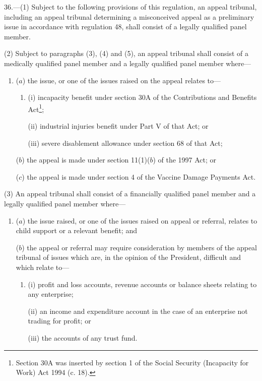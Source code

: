 \documentclass[12pt,a4paper]{article}
\begin{document}
36.—(1) Subject to the following provisions of this regulation, an appeal tribunal, including an appeal tribunal determining a misconceived appeal as a preliminary issue in accordance with regulation 48, shall consist of a legally qualified panel member.

(2) Subject to paragraphs (3), (4) and (5), an appeal tribunal shall consist of a medically qualified panel member and a legally qualified panel member where—
\begin{enumerate}\item[]
($a$) the issue, or one of the issues raised on the appeal relates to—
\begin{enumerate}\item[]
(i) incapacity benefit under section 30A of the Contributions and Benefits Act\footnote{\frenchspacing Section 30A was inserted by section 1 of the Social Security (Incapacity for Work) Act 1994 (c. 18).};

(ii) industrial injuries benefit under Part V of that Act; or

(iii) severe disablement allowance under section 68 of that Act;
\end{enumerate}

($b$) the appeal is made under section 11(1)($b$) of the 1997 Act; or

($c$) the appeal is made under section 4 of the Vaccine Damage Payments Act.
\end{enumerate}

(3) An appeal tribunal shall consist of a financially qualified panel member and a legally qualified panel member where—
\begin{enumerate}\item[]
($a$) the issue raised, or one of the issues raised on appeal or referral, relates to child support or a relevant benefit; and

($b$) the appeal or referral may require consideration by members of the appeal tribunal of issues which are, in the opinion of the President, difficult and which relate to—
\begin{enumerate}\item[]
(i) profit and loss accounts, revenue accounts or balance sheets relating to any enterprise;

(ii) an income and expenditure account in the case of an enterprise not trading for profit; or

(iii) the accounts of any trust fund.
\end{enumerate}
\end{enumerate}
\end{document}
